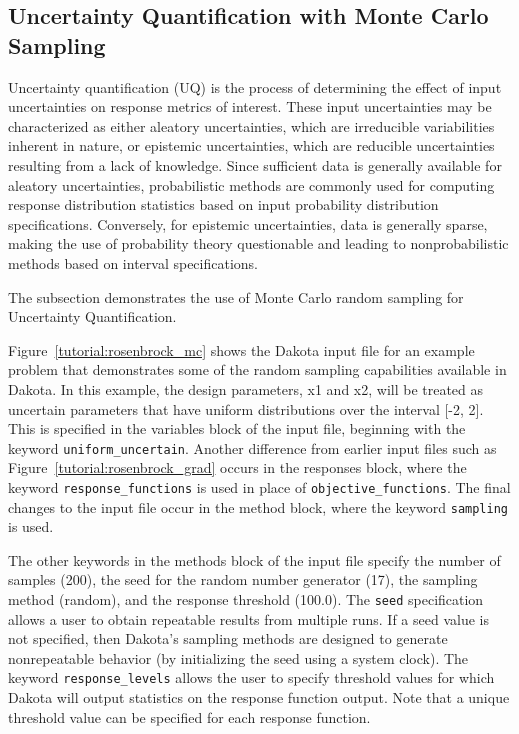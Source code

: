 \subsection{Uncertainty Quantification with Monte Carlo Sampling}\label{tutorial:examples:uncert_quant}

Uncertainty quantification (UQ) is the process of determining the
effect of input uncertainties on response metrics of interest. These
input uncertainties may be characterized as either aleatory
uncertainties, which are irreducible variabilities inherent in nature,
or epistemic uncertainties, which are reducible uncertainties
resulting from a lack of knowledge. Since sufficient data is
generally available for aleatory uncertainties, probabilistic methods
are commonly used for computing response distribution statistics based
on input probability distribution specifications. Conversely, for
epistemic uncertainties, data is generally sparse, making the use of
probability theory questionable and leading to nonprobabilistic
methods based on interval specifications.

The subsection demonstrates the use of Monte Carlo random sampling
for Uncertainty Quantification.

Figure~\ref{tutorial:rosenbrock_mc} shows the Dakota input file for
an example problem that demonstrates some of the random sampling
capabilities available in Dakota. In this example, the design
parameters, x1 and x2, will be treated as uncertain parameters that
have uniform distributions over the interval [-2, 2]. This is
specified in the variables block of the input file, beginning with
the keyword \texttt{uniform\_uncertain}.
Another difference from earlier input files such as
Figure~\ref{tutorial:rosenbrock_grad}
occurs in the responses block, where
the keyword \texttt{response\_functions} is used in place of
\texttt{objective\_functions}. The final changes to the input
file occur in the method block, where the keyword
\texttt{sampling} is used.

The other keywords in the methods block of the input file
specify the number of samples (200), the seed for the random number
generator (17), the sampling method (random), and the response
threshold (100.0). The \texttt{seed} specification allows a user to
obtain repeatable results from multiple runs. If a seed value is not
specified, then Dakota's sampling methods are designed to generate
nonrepeatable behavior (by initializing the seed using a system
clock). The keyword \texttt{response\_levels} allows the user to
specify threshold values for which Dakota will output statistics on
the response function output. Note that a unique threshold value can
be specified for each response function.


